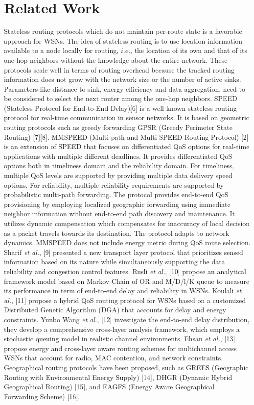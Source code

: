 \documentclass[fleqn,twoside]{article}
\begin{document}
 \section{Related Work}
\label{section:related work}
Stateless routing protocols which do not maintain per-route state is a favorable approach for WSNs. The idea of stateless routing is to use location information available to a node locally for routing, $i.e.$, the location of its own and that of its one-hop neighbors without the knowledge about the entire network. These protocols scale well in terms of routing overhead because the tracked routing information does not grow with the network size
or the number of active sinks. Parameters like distance to sink, energy efficiency and data aggregation, need to be considered to select the next router among the one-hop neighbors.
\vskip 2mm
SPEED (Stateless Protocol for End-to-End Delay)[6] is a well known stateless routing protocol for real-time communication in sensor networks. It is based on geometric routing protocols
such as greedy forwarding GPSR (Greedy Perimeter State Routing) [7][8]. 
MMSPEED (Multi-path and Multi-SPEED Routing Protocol) [2] is an extension of SPEED that focuses on differentiated QoS options for real-time applications with multiple different deadlines. It provides differentiated QoS options both in timeliness domain and the reliability domain. For timeliness, multiple QoS levels are supported by
providing multiple data delivery speed options. For reliability, multiple reliability requirements are supported by probabilistic multi-path forwarding. The protocol provides end-to-end QoS provisioning by employing localized geographic forwarding using immediate neighbor information without end-to-end path discovery and maintenance. It utilizes dynamic compensation which compensates for inaccuracy of local decision as a packet travels towards its destination. The protocol adapts to network dynamics. MMSPEED does not include energy metric during QoS route selection.  
\vskip 2mm
Sharif \emph{et al.}, [9] presented a new transport layer protocol that prioritizes sensed information based on its nature while simultaneously supporting the data reliability and congestion control features. Rusli \emph{et al.}, [10] propose an analytical framework model based on Markov Chain of OR and M/D/l/K queue to measure its performance in term of end-to-end delay and reliability in WSNs. 
\vskip 2mm
Koulali \emph{et al.}, [11] propose a hybrid QoS routing protocol for WSNs based on a customized Distributed Genetic Algorithm (DGA) that accounts for delay and energy constraints. Yunbo Wang \emph{et al.}, [12] investigate the end-to-end delay distribution, they develop a comprehensive cross-layer analysis framework, which employs a stochastic queuing model in realistic channel environments. Ehsan \emph{et al.}, [13] propose energy and cross-layer aware routing schemes for multichannel access WSNs that account for radio, MAC contention, and network constraints. Geographical routing protocols have been proposed, such as GREES (Geographic Routing with Environmental Energy Supply) [14], DHGR (Dynamic Hybrid Geographical Routing) [15], and EAGFS (Energy Aware Geographical Forwarding Scheme) [16].
\end{document}
